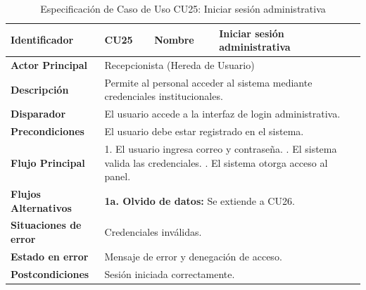 \vspace{0.6cm}
\begingroup
\setlength{\parskip}{0pt}
\begin{longtable}{|p{3.5cm}|p{2cm}|p{2.5cm}|p{7cm}|}
\caption{Especificación de Caso de Uso CU25: Iniciar sesión administrativa}
\label{tab:cu25} \\
\hline
\textbf{Identificador} & CU25 & \textbf{Nombre} & Iniciar sesión administrativa \\ \hline
\textbf{Actor Principal} & \multicolumn{3}{p{11.5cm}|}{Recepcionista (Hereda de Usuario)} \\ \hline
\textbf{Descripción} & \multicolumn{3}{p{11.5cm}|}{Permite al personal acceder al sistema mediante credenciales institucionales.} \\ \hline
\textbf{Disparador} & \multicolumn{3}{p{11.5cm}|}{El usuario accede a la interfaz de login administrativa.} \\ \hline
\textbf{Precondiciones} & \multicolumn{3}{p{11.5cm}|}{El usuario debe estar registrado en el sistema.} \\ \hline
\textbf{Flujo Principal} & \multicolumn{3}{p{11.5cm}|}{1. El usuario ingresa correo y contraseña. \newline 2. El sistema valida las credenciales. \newline 3. El sistema otorga acceso al panel.} \\ \hline
\textbf{Flujos Alternativos} & \multicolumn{3}{p{11.5cm}|}{\textbf{1a. Olvido de datos:} Se extiende a CU26.} \\ \hline
\textbf{Situaciones de error} & \multicolumn{3}{p{11.5cm}|}{Credenciales inválidas.} \\ \hline
\textbf{Estado en error} & \multicolumn{3}{p{11.5cm}|}{Mensaje de error y denegación de acceso.} \\ \hline
\textbf{Postcondiciones} & \multicolumn{3}{p{11.5cm}|}{Sesión iniciada correctamente.} \\ \hline
\end{longtable}
\endgroup

\vspace{0.8cm}


